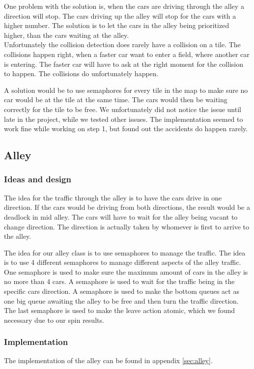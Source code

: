 One problem with the solution is, when the cars are driving through the alley a direction will stop. The cars driving up the alley will stop for the cars with a higher number. The solution is to let the cars in the alley being prioritized higher, than the cars waiting at the alley.
\\

Unfortunately the collision detection does rarely have a collision on a tile. The collisions happen right, when a faster car want to enter a field, where another car is entering. The faster car will have to ask at the right moment for the collision to happen. The collisions do unfortunately happen. 

A solution would be to use semaphores for every tile in the map to make sure no car would be at the tile at the same time. The cars would then be waiting correctly for the tile to be free. We unfortunately did not notice the issue until late in the project, while we tested other issues. The implementation seemed to work fine while working on step 1, but found out the accidents do happen rarely.

\subsection{Alley}
\subsubsection{Ideas and design}
The idea for the traffic through the alley is to have the cars drive in one direction. If the cars would be driving from both directions, the result would be a deadlock in mid alley. The cars will have to wait for the alley being vacant to change direction. The direction is actually taken by whomever is first to arrive to the alley.

The idea for our alley class is to use semaphores to manage the traffic. The idea is to use 4 different semaphores to manage different aspects of the alley traffic. One semaphore is used to make sure the maximum amount of cars in the alley is no more than 4 cars. A semaphore is used to wait for the traffic being in the specific cars direction. A semaphore is used to make the bottom queues act as one big queue awaiting the alley to be free and then turn the traffic direction. The last semaphore is used to make the leave action atomic, which we found necessary due to our spin results. 

\subsubsection{Implementation}
The implementation of the alley can be found in appendix \ref{sec:alley}.
\\


